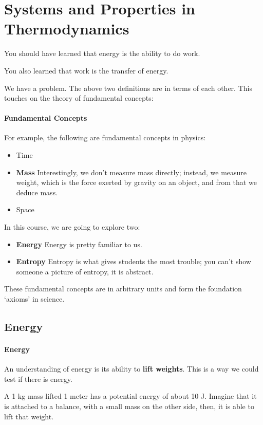 \documentclass[11pt]{report}
\begin{document}
\section{Systems and Properties in Thermodynamics}
\begin{definition}[Energy]
    You should have learned that energy is the ability to do work.
\end{definition}


\begin{definition}[Work]
    You also learned that work is the transfer of energy.
\end{definition}

We have a problem. The above two definitions are in terms of each other. This touches on the theory of fundamental concepts:

\paragraph{Fundamental Concepts} For example, the following are fundamental concepts in physics:
\begin{itemize}
    \item Time
    \item \textbf{Mass} Interestingly, we don't measure mass directly; instead, we measure weight, which is the force exerted by gravity on an object, and from that we deduce mass.
    \item Space
\end{itemize}
In this course, we are going to explore two:
\begin{itemize}
    \item \textbf{Energy} Energy is pretty familiar to us. 
    \item \textbf{Entropy} Entropy is what gives students the most trouble; you can't show someone a picture of entropy, it is abstract.
\end{itemize}

These fundamental concepts are in arbitrary units and form the foundation `axioms' in science.

\subsection{Energy}
\paragraph{Energy} An understanding of energy is its ability to \textbf{lift weights}. This is a way we could test if there is energy.
\begin{example}
    A 1 kg mass lifted 1 meter has a potential energy of about 10 J. Imagine that it is attached to a balance, with a small mass on the other side, then, it is able to lift that weight.
\end{example}
\end{document}

